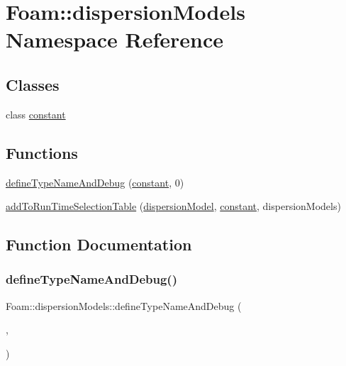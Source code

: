 \hypertarget{namespaceFoam_1_1dispersionModels}{}\section{Foam\+:\+:dispersion\+Models Namespace Reference}
\label{namespaceFoam_1_1dispersionModels}
\subsection*{Classes}
\begin{DoxyCompactItemize}
\item 
class \hyperlink{classFoam_1_1dispersionModels_1_1constant}{constant}
\end{DoxyCompactItemize}
\subsection*{Functions}
\begin{DoxyCompactItemize}
\item 
\hyperlink{namespaceFoam_1_1dispersionModels_a3a42a3035e206db6d3013d95b37db847}{define\+Type\+Name\+And\+Debug} (\hyperlink{classFoam_1_1dispersionModels_1_1constant}{constant}, 0)
\item 
\hyperlink{namespaceFoam_1_1dispersionModels_a8dda138300c4d7741ccc5321b66a26e3}{add\+To\+Run\+Time\+Selection\+Table} (\hyperlink{classFoam_1_1dispersionModel}{dispersion\+Model}, \hyperlink{classFoam_1_1dispersionModels_1_1constant}{constant}, dispersion\+Models)
\end{DoxyCompactItemize}


\subsection{Function Documentation}
\mbox{\label{namespaceFoam_1_1dispersionModels_a3a42a3035e206db6d3013d95b37db847}} 
\subsubsection{\texorpdfstring{define\+Type\+Name\+And\+Debug()}{defineTypeNameAndDebug()}}
{\footnotesize\ttfamily Foam\+::dispersion\+Models\+::define\+Type\+Name\+And\+Debug (\begin{DoxyParamCaption}\item[{\hyperlink{classFoam_1_1dispersionModels_1_1constant}{constant}}]{,  }\item[{0}]{ }\end{DoxyParamCaption})}

